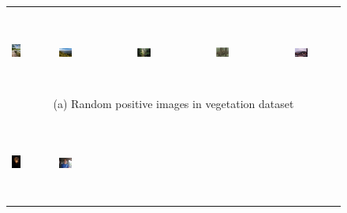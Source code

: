 \begin{figure}[th]
{{\begin{center}
\begin{tabular}{@{}c@{\,\,\,}c@{\,\,\,}c@{\,\,\,}c@{\,\,\,}c@{\,\,\,}}
\\[-6pt]
\hline
\\[-6pt]
\includegraphics[height=1in]{imggrid/datasetposi/6.jpg} &
\includegraphics[width=0.19\textwidth]{imggrid/datasetposi/7.jpg} &
\includegraphics[width=0.19\textwidth]{imggrid/datasetposi/8.jpg} &
\includegraphics[width=0.19\textwidth]{imggrid/datasetposi/9.jpg} &
\includegraphics[width=0.19\textwidth]{imggrid/datasetposi/10.jpg} \\
\multicolumn{5}{c}{(a) Random positive images in vegetation dataset} \\ 
\\[-6pt]
\hline
\\[-6pt]
\includegraphics[height=1in]{imggrid/datasetnega/6.jpg} &
\includegraphics[width=0.19\textwidth]{imggrid/datasetnega/9.jpg} &


\end{tabular}
\end{center}}}
\end{figure}

